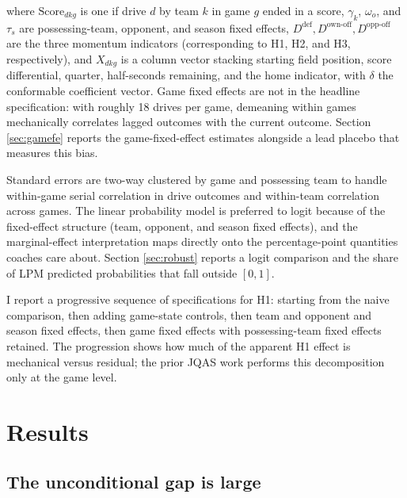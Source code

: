 \documentclass[11pt]{article}
\begin{document}
where $\text{Score}_{dkg}$ is one if drive $d$ by team $k$ in game $g$ ended
in a score, $\gamma_k$, $\omega_o$, and $\tau_s$ are possessing-team,
opponent, and season fixed effects, $D^{\text{def}}, D^{\text{own-off}}, D^{\text{opp-off}}$ are the
three momentum indicators (corresponding to H1, H2, and H3, respectively),
and $X_{dkg}$ is a column vector stacking starting field position, score
differential, quarter, half-seconds remaining, and the home indicator, with
$\delta$ the conformable coefficient vector.
Game fixed effects are not in the headline specification: with roughly 18
drives per game, demeaning within games mechanically correlates lagged
outcomes with the current outcome. Section \ref{sec:gamefe} reports the
game-fixed-effect estimates alongside a lead placebo that measures this bias.

Standard errors are two-way clustered by game and possessing team
\citep{cameron2011robust} to handle within-game serial correlation in drive
outcomes and within-team correlation across games. The linear probability
model is preferred to logit because of the fixed-effect structure (team,
opponent, and season fixed effects), and
the marginal-effect interpretation maps directly onto the percentage-point
quantities coaches care about. Section \ref{sec:robust} reports a logit
comparison and the share of LPM predicted probabilities that fall outside
$[0,1]$.

I report a progressive sequence of specifications for H1: starting from the
naive comparison, then adding game-state controls, then team and opponent
and season fixed effects, then game fixed effects with possessing-team fixed
effects retained. The progression shows how much of the apparent H1 effect
is mechanical versus residual; the prior JQAS work performs this
decomposition only at the game level.

\section{Results}\label{sec:results}

\subsection{The unconditional gap is large}
\end{document}
